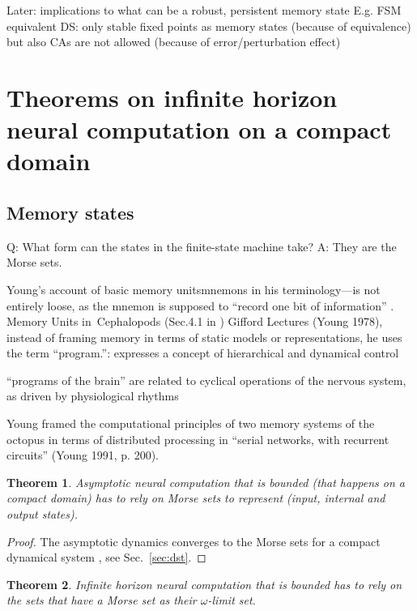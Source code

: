 \documentclass{scrartcl}
\newtheorem{theorem}{Theorem}
\theoremstyle{definition}
\theoremstyle{remark}
\begin{document}
Later: implications to what can be a robust, persistent memory state
E.g.  FSM equivalent DS: only stable fixed points as memory states (because of equivalence)
but also CAs are not allowed (because of error/perturbation effect)


\section{Theorems on infinite horizon neural computation on a compact domain}\label{sec:theorems}


\subsection{Memory states}%
Q: What form can the states in the finite-state machine take?
A: They are the Morse sets.

Young’s account of basic memory unitsmnemons in his terminology—is not entirely loose, as the mnemon is supposed to “record one bit of information” \citep{young1978}. %
Memory Units in Cephalopods (Sec.4.1 in \citep{milkowski2018})
Gifford Lectures (Young 1978), instead of framing memory in terms of static models or representations, he uses the term “program.”: expresses a concept of hierarchical and dynamical control

“programs of the brain” are related to cyclical operations of the nervous system, as driven by physiological rhythms

Young framed the computational principles of two memory systems of the octopus in terms of distributed processing in “serial networks, with recurrent circuits” (Young 1991, p. 200).

\begin{theorem}
Asymptotic neural computation that is bounded (that happens on a compact domain) has to rely on Morse sets to represent (input, internal and output states).
\end{theorem}

\begin{proof}
The asymptotic dynamics converges to the Morse sets for a compact dynamical system \cite{conley1978}, see Sec.~\ref{sec:dst}.
\end{proof}


\begin{theorem}	
Infinite horizon neural computation that is bounded has to rely on the sets that have a Morse set as their $\omega$-limit set.
\end{theorem}	
\end{document}
